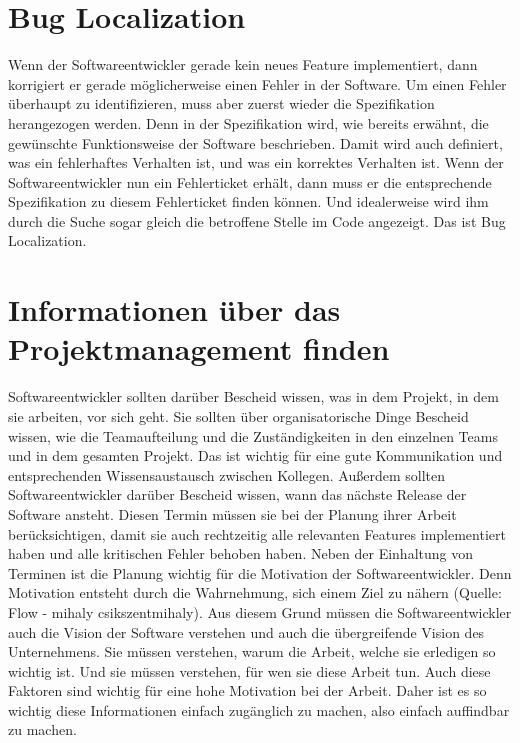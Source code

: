\section{Bug Localization}
Wenn der Softwareentwickler gerade kein neues Feature implementiert, dann korrigiert er gerade möglicherweise einen Fehler in der Software.
Um einen Fehler überhaupt zu identifizieren, muss aber zuerst wieder die Spezifikation herangezogen werden.
Denn in der Spezifikation wird, wie bereits erwähnt, die gewünschte Funktionsweise der Software beschrieben.
Damit wird auch definiert, was ein fehlerhaftes Verhalten ist, und was ein korrektes Verhalten ist.
Wenn der Softwareentwickler nun ein Fehlerticket erhält, dann muss er die entsprechende Spezifikation zu diesem Fehlerticket finden können.
Und idealerweise wird ihm durch die Suche sogar gleich die betroffene Stelle im Code angezeigt.
Das ist Bug Localization.

\section{Informationen über das Projektmanagement finden}
Softwareentwickler sollten darüber Bescheid wissen, was in dem Projekt, in dem sie arbeiten, vor sich geht.
Sie sollten über organisatorische Dinge Bescheid wissen, wie die Teamaufteilung und die Zuständigkeiten in den einzelnen Teams und in dem gesamten Projekt.
Das ist wichtig für eine gute Kommunikation und entsprechenden Wissensaustausch zwischen Kollegen.
Außerdem sollten Softwareentwickler darüber Bescheid wissen, wann das nächste Release der Software ansteht.
Diesen Termin müssen sie bei der Planung ihrer Arbeit berücksichtigen, damit sie auch rechtzeitig alle relevanten Features implementiert haben und alle kritischen Fehler behoben haben.
Neben der Einhaltung von Terminen ist die Planung wichtig für die Motivation der Softwareentwickler.
Denn Motivation entsteht durch die Wahrnehmung, sich einem Ziel zu nähern (Quelle: Flow - mihaly csikszentmihaly).
Aus diesem Grund müssen die Softwareentwickler auch die Vision der Software verstehen und auch die übergreifende Vision des Unternehmens.
Sie müssen verstehen, warum die Arbeit, welche sie erledigen so wichtig ist.
Und sie müssen verstehen, für wen sie diese Arbeit tun.
Auch diese Faktoren sind wichtig für eine hohe Motivation bei der Arbeit.
Daher ist es so wichtig diese Informationen einfach zugänglich zu machen, also einfach auffindbar zu machen.

